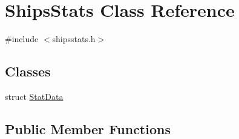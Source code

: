 \hypertarget{class_ships_stats}{}\section{Ships\+Stats Class Reference}
\label{class_ships_stats}


{\ttfamily \#include $<$shipsstats.\+h$>$}

\subsection*{Classes}
\begin{DoxyCompactItemize}
\item 
struct \mbox{\hyperlink{struct_ships_stats_1_1_stat_data}{Stat\+Data}}
\end{DoxyCompactItemize}
\subsection*{Public Member Functions}
